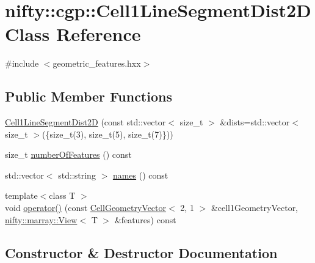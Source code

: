\hypertarget{classnifty_1_1cgp_1_1Cell1LineSegmentDist2D}{}\section{nifty\+:\+:cgp\+:\+:Cell1\+Line\+Segment\+Dist2\+D Class Reference}
\label{classnifty_1_1cgp_1_1Cell1LineSegmentDist2D}


{\ttfamily \#include $<$geometric\+\_\+features.\+hxx$>$}

\subsection*{Public Member Functions}
\begin{DoxyCompactItemize}
\item 
\hyperlink{classnifty_1_1cgp_1_1Cell1LineSegmentDist2D_a5d5bf2934bf6be384bff119e69ca275b}{Cell1\+Line\+Segment\+Dist2\+D} (const std\+::vector$<$ size\+\_\+t $>$ \&dists=std\+::vector$<$ size\+\_\+t $>$(\{size\+\_\+t(3), size\+\_\+t(5), size\+\_\+t(7)\}))
\item 
size\+\_\+t \hyperlink{classnifty_1_1cgp_1_1Cell1LineSegmentDist2D_a993da64ae0e96d92daa94ab7a4a8195b}{number\+Of\+Features} () const 
\item 
std\+::vector$<$ std\+::string $>$ \hyperlink{classnifty_1_1cgp_1_1Cell1LineSegmentDist2D_a97f871d6c777e196edcc576a73009078}{names} () const 
\item 
{\footnotesize template$<$class T $>$ }\\void \hyperlink{classnifty_1_1cgp_1_1Cell1LineSegmentDist2D_a57d9c462ac4f0ed150d57ab752d4c689}{operator()} (const \hyperlink{classnifty_1_1cgp_1_1CellGeometryVector}{Cell\+Geometry\+Vector}$<$ 2, 1 $>$ \&cell1\+Geometry\+Vector, \hyperlink{classandres_1_1View}{nifty\+::marray\+::\+View}$<$ T $>$ \&features) const 
\end{DoxyCompactItemize}


\subsection{Constructor \& Destructor Documentation}
\hypertarget{classnifty_1_1cgp_1_1Cell1LineSegmentDist2D_a5d5bf2934bf6be384bff119e69ca275b}{}
